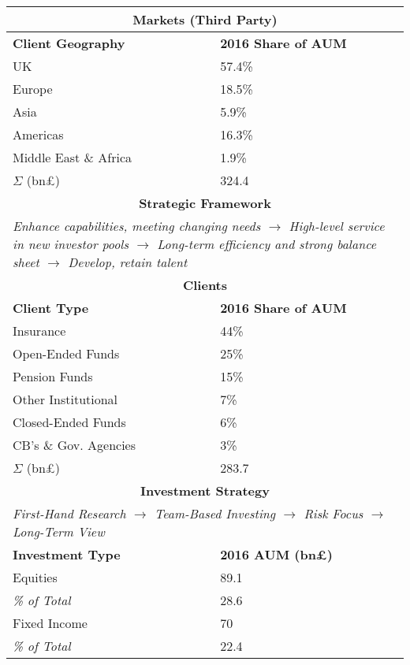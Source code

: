 \documentclass[11pt, english]{article}
\begin{document}
\begin{center}
	\scriptsize
\begin{longtable}{p{5cm}p{6cm}}
	\hline
	\hline
	\multicolumn{2}{c}{\textbf{Markets (Third Party)}}\\
        \hline
	\hline
        \textbf{Client Geography} & \textbf{2016 Share of AUM}\\
	\hline
	UK & 57.4\%\\
	Europe & 18.5\%\\
	Asia & 5.9\%\\
	Americas & 16.3\%\\
	Middle East \& Africa & 1.9\%\\
	\hline
	$\Sigma$ (bn\pounds) & 324.4\\
	\hline
	\hline
	\multicolumn{2}{c}{\textbf{Strategic Framework}}\\
        \hline
	\hline
	\multicolumn{2}{p{12cm}}{\textit{Enhance capabilities, meeting changing needs $\rightarrow$ High-level service in new investor pools $\rightarrow$ Long-term efficiency and strong balance sheet $\rightarrow$ Develop, retain talent}}\\
	\hline
	\hline
	\multicolumn{2}{c}{\textbf{Clients}}\\
        \hline
	\hline
	\textbf{Client Type} & \textbf{2016 Share of AUM}\\
	\hline
	Insurance & 44\%\\
	Open-Ended Funds & 25\%\\
	Pension Funds & 15\%\\
	Other Institutional & 7\%\\
	Closed-Ended Funds & 6\%\\
	CB's \& Gov. Agencies & 3\%\\
	\hline
	$\Sigma$ (bn\pounds) & 283.7\\
	\hline
        \hline                                
        \multicolumn{2}{c}{\textbf{Investment Strategy}}\\
        \hline
        \hline 
	\multicolumn{2}{p{12cm}}{\textit{First-Hand Research $\rightarrow$ Team-Based Investing $\rightarrow$ Risk Focus $\rightarrow$ Long-Term View}}\\
	\hline
	\textbf{Investment Type} & \textbf{2016 AUM (bn\pounds)}\\
	\hline
	Equities & 89.1\\
	\textit{\% of Total} & 28.6\\
	Fixed Income & 70\\
	\textit{\% of Total} & 22.4\\

\end{longtable}
\end{center}
\end{document}

